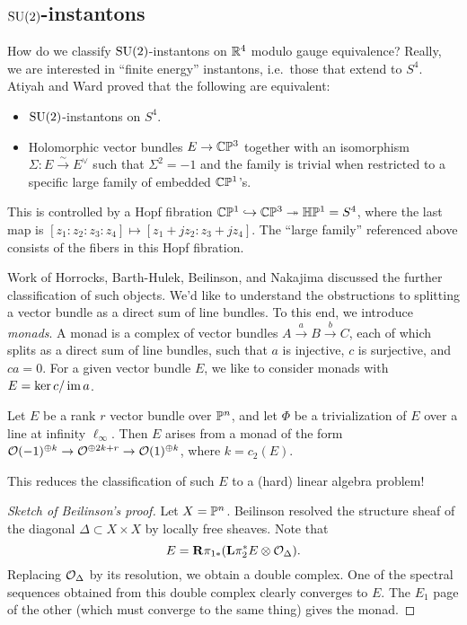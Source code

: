 \documentclass{article}
\begin{document}
\subsection{$\mathrm{SU}(2)$-instantons}

How do we classify $\mathrm{SU}(2)$-instantons on $\mathbb{R}^4$ modulo gauge equivalence?
Really, we are interested in ``finite energy'' instantons, i.e.\ those that extend to $S^4$.
Atiyah and Ward proved that the following are equivalent:
\begin{itemize}
	\item $\mathrm{SU}(2)$-instantons on $S^4$.
	\item Holomorphic vector bundles $E \to \mathbb{C}\mathbb{P}^3$ together with an isomorphism $\Sigma: E \xrightarrow{\sim} E^\vee$ such that $\Sigma^2 = -1$ and the family is trivial when restricted to a specific large family of embedded $\mathbb{C}\mathbb{P}^1$'s.
\end{itemize}
This is controlled by a Hopf fibration $\mathbb{C}\mathbb{P}^1 \hookrightarrow \mathbb{C}\mathbb{P}^3 \twoheadrightarrow \mathbb{H}\mathbb{P}^1 = S^4$, where the last map is $[z_1 : z_2 : z_3 : z_4] \mapsto [z_1 + j z_2 : z_3 + j z_4]$.
The ``large family'' referenced above consists of the fibers in this Hopf fibration.

Work of Horrocks, Barth-Hulek, Beilinson, and Nakajima discussed the further classification of such objects.
We'd like to understand the obstructions to splitting a vector bundle as a direct sum of line bundles.
To this end, we introduce \emph{monads}.
A monad is a complex of vector bundles $A \xrightarrow{a} B \xrightarrow{b} C$, each of which splits as a direct sum of line bundles, such that $a$ is injective, $c$ is surjective, and $ca = 0$.
For a given vector bundle $E$, we like to consider monads with $E = \ker c / \operatorname{im} a$.

\begin{thm}
	Let $E$ be a rank $r$ vector bundle over $\mathbb{P}^n$, and let $\Phi$ be a trivialization of $E$ over a line at infinity $\ell_\infty$.
	Then $E$ arises from a monad of the form $\mathcal{O}(-1)^{\oplus k} \to \mathcal{O}^{\oplus 2k + r} \to \mathcal{O}(1)^{\oplus k}$, where $k = c_2(E)$.
\end{thm}

This reduces the classification of such $E$ to a (hard) linear algebra problem!

\begin{proof}[Sketch of Beilinson's proof]
	Let $X = \mathbb{P}^n$.
	Beilinson resolved the structure sheaf of the diagonal $\Delta \subset X \times X$ by locally free sheaves.
	Note that
	\[
		E = \mathbf{R} \pi_{1*}(\mathbf{L} \pi_2^* E \otimes \mathcal{O}_\Delta).
	\]
	Replacing $\mathcal{O}_\Delta$ by its resolution, we obtain a double complex.
	One of the spectral sequences obtained from this double complex clearly converges to $E$.
	The $E_1$ page of the other (which must converge to the same thing) gives the monad.
\end{proof}
\end{document}
